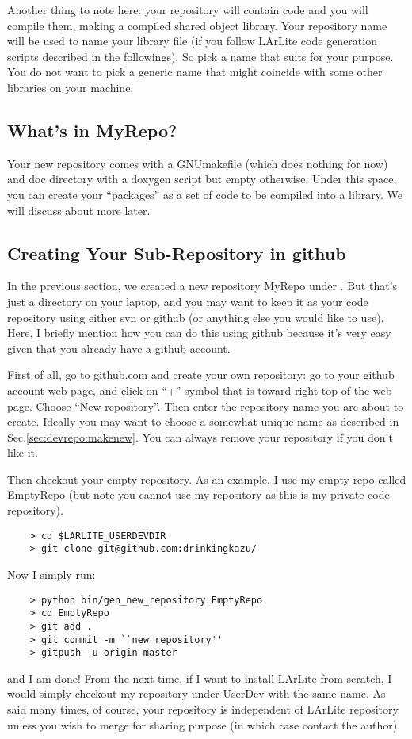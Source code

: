 Another thing to note here: your repository will contain code and you will compile them, making a compiled 
shared object library. Your repository name will be used to name your library file (if you follow LArLite 
code generation scripts described in the followings). So pick a name that suits for your purpose. You do 
not want to pick a generic name that might coincide with some other libraries on your machine.

\subsection{What's in MyRepo?}

Your new repository comes with a GNUmakefile (which does nothing for now) and {\ttfamily doc} 
directory with a doxygen script but empty otherwise. Under this space, you can create your ``packages'' as a 
set of \CPP code to be compiled into a library. We will discuss about more later.

\subsection{Creating Your Sub-Repository in {\ttfamily github}}
In the previous section, we created a new repository {\ttfamily MyRepo} under \UserDev. But that's just a directory on your laptop, and you may want to keep it as your code repository using either {\ttfamily svn} or {\ttfamily github} (or anything else you would like to use). Here, I briefly mention how you can do this using {\ttfamily github} because it's very easy given that you already have a {\ttfamily github} account.

First of all, go to {\ttfamily github.com} and create your own repository: go to your {\ttfamily github} account web page, and click on ``+'' symbol that is toward right-top of the web page. Choose ``New repository''. Then enter the repository name you are about to create. Ideally you may want to choose a somewhat unique name as described in Sec.\ref{sec:devrepo:makenew}. You can always remove your repository if you don't like it.

Then checkout your empty repository. 
As an example, I use my empty repo called {\ttfamily EmptyRepo} (but note you cannot use my repository as this
is my private code repository).
\begin{lstlisting}
    > cd $LARLITE_USERDEVDIR
    > git clone git@github.com:drinkingkazu/
\end{lstlisting}
Now I simply run:
\begin{lstlisting}
    > python bin/gen_new_repository EmptyRepo
    > cd EmptyRepo
    > git add .
    > git commit -m ``new repository''
    > gitpush -u origin master
\end{lstlisting}
and I am done!
From the next time, if I want to install LArLite from scratch, I would simply checkout my repository under UserDev 
with the same name. As said many times, of course, your repository is independent of LArLite repository unless
you wish to merge for sharing purpose (in which case contact the author).




